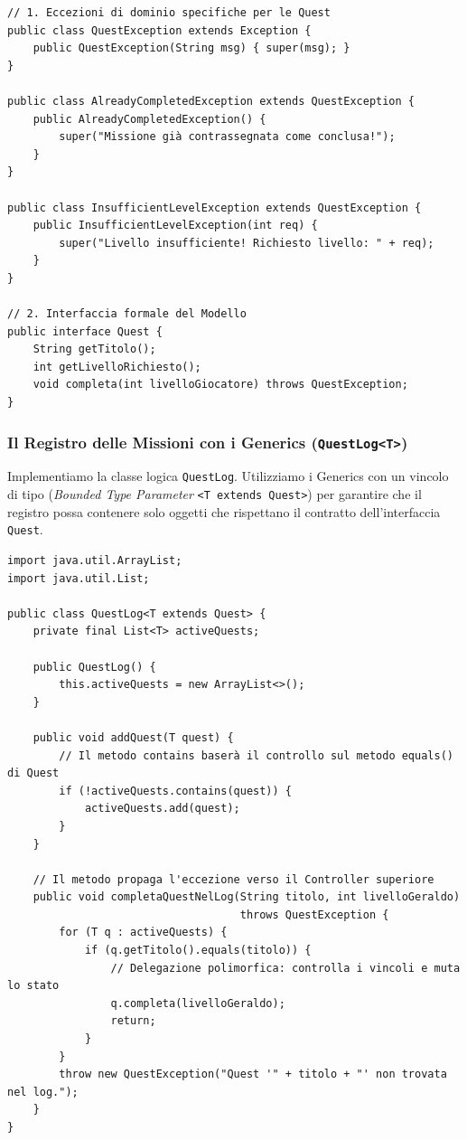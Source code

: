 \documentclass[12pt, a4paper]{article}
\begin{document}
\begin{verbatim}
// 1. Eccezioni di dominio specifiche per le Quest
public class QuestException extends Exception {
    public QuestException(String msg) { super(msg); }
}

public class AlreadyCompletedException extends QuestException {
    public AlreadyCompletedException() { 
        super("Missione già contrassegnata come conclusa!"); 
    }
}

public class InsufficientLevelException extends QuestException {
    public InsufficientLevelException(int req) { 
        super("Livello insufficiente! Richiesto livello: " + req); 
    }
}

// 2. Interfaccia formale del Modello
public interface Quest {
    String getTitolo();
    int getLivelloRichiesto();
    void completa(int livelloGiocatore) throws QuestException;
}
\end{verbatim}

\newpage

\subsubsection{Il Registro delle Missioni con i Generics (\texttt{QuestLog<T>})}
Implementiamo la classe logica \texttt{QuestLog}. Utilizziamo i Generics con un vincolo di tipo (\textit{Bounded Type Parameter} \texttt{<T extends Quest>}) per garantire che il registro possa contenere solo oggetti che rispettano il contratto dell'interfaccia \texttt{Quest}.

\begin{verbatim}
import java.util.ArrayList;
import java.util.List;

public class QuestLog<T extends Quest> {
    private final List<T> activeQuests;

    public QuestLog() {
        this.activeQuests = new ArrayList<>();
    }

    public void addQuest(T quest) {
        // Il metodo contains baserà il controllo sul metodo equals() di Quest
        if (!activeQuests.contains(quest)) {
            activeQuests.add(quest);
        }
    }

    // Il metodo propaga l'eccezione verso il Controller superiore
    public void completaQuestNelLog(String titolo, int livelloGeraldo) 
                                    throws QuestException {
        for (T q : activeQuests) {
            if (q.getTitolo().equals(titolo)) {
                // Delegazione polimorfica: controlla i vincoli e muta lo stato
                q.completa(livelloGeraldo); 
                return;
            }
        }
        throw new QuestException("Quest '" + titolo + "' non trovata nel log.");
    }
}
\end{verbatim}
\end{document}
